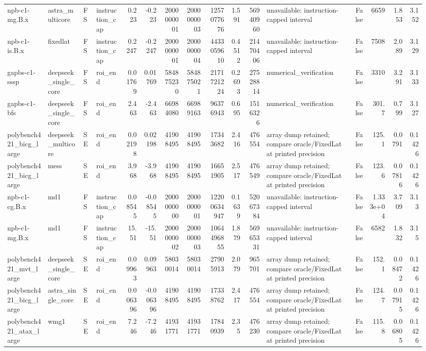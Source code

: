 \begin{tabular}{llllrrrrrrrlrrrr}
npb-c1-mg.B.x & astra\_multicore & FS & instruction\_cap & 0.223 & -0.223 & 2000000001 & 2000000003 & 1257077676 & 1.591 & 56940960 & unavailable: instruction-capped interval & False & 6659 & 1.853 & 3.152 \\
npb-c1-is.B.x & fixedlat & FS & instruction\_cap & 0.2247 & -0.2247 & 2000000001 & 2000000004 & 4433059610 & 0.4512 & 21470406 & unavailable: instruction-capped interval & False & 7508 & 2.089 & 3.129 \\
gapbs-c1-sssp & deepseek\_single\_core & FS & roi\_end & 0.01769 & 0.01769 & 584875230 & 584875021 & 2171721224 & 0.2693 & 27528814 & numerical\_verification & False & 3310 & 3.291 & 3.133 \\
gapbs-c1-bfs & deepseek\_single\_core & FS & roi\_end & 2.463 & -2.463 & 66984080 & 66989163 & 96376943 & 0.695 & 1516326 & numerical\_verification & False & 301.7 & 0.799 & 3.127 \\
polybench421\_bicg\_large & deepseek\_multicore & SE & roi\_end & 0.02198 & 0.02198 & 41908495 & 41908495 & 17343682 & 2.416 & 476554 & array dump retained; compare oracle/FixedLat at printed precision & False & 125.1 & 0.0791 & 0.1426 \\
polybench421\_bicg\_large & mess & SE & roi\_end & 3.968 & -3.968 & 41908495 & 41908495 & 16651905 & 2.517 & 476549 & array dump retained; compare oracle/FixedLat at printed precision & False & 123.6 & 0.07816 & 0.1426 \\
npb-c1-cg.B.x & md1 & FS & instruction\_cap & 0.08545 & -0.08545 & 2000000000 & 2000000001 & 12200634947 & 0.1639 & 52067384 & unavailable: instruction-capped interval & False & 1.333e+04 & 3.709 & 3.13 \\
npb-c1-mg.B.x & md1 & FS & instruction\_cap & 15.51 & -15.51 & 2000000002 & 2000000003 & 1064496855 & 1.879 & 56965331 & unavailable: instruction-capped interval & False & 6582 & 1.832 & 3.15 \\
polybench421\_mvt\_large & deepseek\_single\_core & SE & roi\_end & 0.09963 & 0.09963 & 58030014 & 58030014 & 27905913 & 2.079 & 965701 & array dump retained; compare oracle/FixedLat at printed precision & False & 152.1 & 0.08472 & 0.1426 \\
polybench421\_bicg\_large & astra\_single\_core & SE & roi\_end & 0.006396 & -0.006396 & 41908495 & 41908495 & 17338762 & 2.417 & 476554 & array dump retained; compare oracle/FixedLat at printed precision & False & 124.7 & 0.07915 & 0.1426 \\
polybench421\_atax\_large & wmg1 & SE & roi\_end & 7.246 & -7.246 & 41931771 & 41931771 & 17840939 & 2.35 & 476230 & array dump retained; compare oracle/FixedLat at printed precision & False & 115.8 & 0.06805 & 0.1426 \\

\end{tabular}
